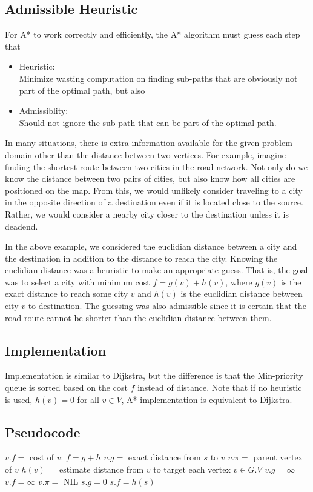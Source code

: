 \documentclass{article}
\begin{document}
\subsection{Admissible Heuristic}
For A* to work correctly and efficiently, the A* algorithm must guess each step that
\begin{itemize}
    \item Heuristic: \\
    Minimize wasting computation on finding sub-paths that are obviously not part of the optimal path\cite{HNR}, but also 
    \item Admissiblity: \\
    Should not ignore the sub-path that can be part of the optimal path\cite{HNR}.  
\end{itemize}
In many situations, there is extra information available for the given problem domain other than the distance between two vertices. For example, imagine finding the shortest route between two cities in the road network. Not only do we know the distance between two pairs of cities, but also know how all cities are positioned on the map. From this, we would unlikely consider traveling to a city in the opposite direction of a destination even if it is located close to the source. Rather, we would consider a nearby city closer to the destination unless it is deadend. 

In the above example, we considered the euclidian distance between a city and the destination in addition to the distance to reach the city. Knowing the euclidian distance was a heuristic to make an appropriate guess. That is, the goal was to select a city with minimum cost $f = g(v) + h(v)$, where $g(v)$ is the exact distance to reach some city $v$ and $h(v)$ is the euclidian distance between city $v$ to destination. The guessing was also admissible since it is certain that the road route cannot be shorter than the euclidian distance between them\cite{HNR}.


\subsection{Implementation}
Implementation is similar to Dijkstra, but the difference is that the Min-priority queue is sorted based on the cost $f$ instead of distance. Note that if no heuristic is used, $h(v) = 0$ for all $v \in V$, A* implementation is equivalent to Dijkstra.

\subsection{Pseudocode}
\begin{codebox}
\li \Comment $v.f = $ cost of $v$: $f = g + h$
\li \Comment $v.g = $ exact distance from $s$ to $v$
\li \Comment $v.\pi = $ parent vertex of $v$
\li \Comment $h(v) = $ estimate distance from $v$ to target
\li
\li \For each vertex $v \in G.V$
\li     \Do
            $v.g = \infty$
\li         $v.f = \infty$ 
\li         $v.\pi =$ NIL
        \End
\li $s.g = 0$
\li $s.f = h(s)$
\end{codebox}
\end{document}

